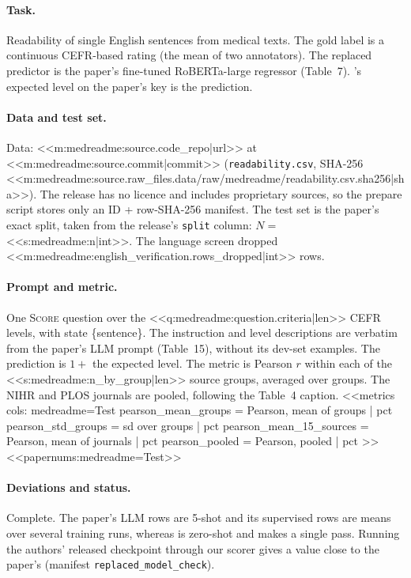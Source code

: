 \paragraph{Task.} Readability of single English sentences from medical texts. The gold label is a continuous
CEFR-based rating (the mean of two annotators). The replaced predictor is the paper's fine-tuned RoBERTa-large
regressor (Table~7). \jev{}'s expected level on the paper's key is the prediction.

\paragraph{Data and test set.} Data: <<m:medreadme:source.code_repo|url>> at
<<m:medreadme:source.commit|commit>> (\texttt{readability.csv}, SHA-256
<<m:medreadme:source.raw_files.data/raw/medreadme/readability.csv.sha256|sha>>). The release has no licence
and includes proprietary sources, so the prepare script stores only an ID + row-SHA-256 manifest. The test set is the
paper's exact split, taken from the release's \texttt{split} column: $N=$ <<s:medreadme:n|int>>. The language
screen dropped <<m:medreadme:english_verification.rows_dropped|int>> rows.

\paragraph{Prompt and metric.} One \textsc{Score} question over the <<q:medreadme:question.criteria|len>> CEFR
levels, with state \{sentence\}. The instruction and level descriptions are verbatim from the paper's LLM
prompt (Table~15), without its dev-set examples. The prediction is $1+$ the expected level. The metric is
Pearson $r$ within each of the <<s:medreadme:n_by_group|len>> source groups, averaged over groups. The NIHR and PLOS journals are pooled,
following the Table~4 caption.
<<metrics
cols: medreadme=Test
pearson_mean_groups = Pearson, mean of groups | pct
pearson_std_groups = \quad sd over groups | pct
pearson_mean_15_sources = Pearson, mean of journals | pct
pearson_pooled = Pearson, pooled | pct
>>
<<papernums:medreadme=Test>>

\paragraph{Deviations and status.} Complete. The paper's LLM rows are 5-shot and its supervised rows are
means over several training runs, whereas \jev{} is zero-shot and makes a single pass. Running the authors' released
checkpoint through our scorer gives a value close to the paper's (manifest \texttt{replaced\_model\_check}).
